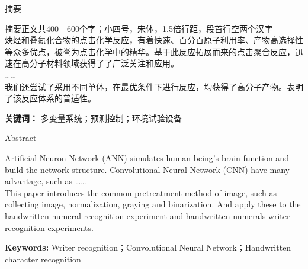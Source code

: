 \thispagestyle{plain}


\begin{center}
    \vspace{0.5\baselineskip}
    {\heiti {} 摘要}
    \vspace{0.5\baselineskip}
\end{center}

\songti {}
摘要正文共400—600个字；小四号，宋体，1.5倍行距，段首行空两个汉字\\
\hspace*{\parindent}炔烃和叠氮化合物的点击化学反应，有着快速、百分百原子利用率、产物高选择性等众多优点，被誉为点击化学中的精华。基于此反应拓展而来的点击聚合反应，迅速在高分子材料领域获得了了广泛关注和应用。\\
\hspace*{\parindent}……\\
\hspace*{\parindent}我们还尝试了采用不同单体，在最优条件下进行反应，均获得了高分子产物。表明了该反应体系的普适性。
\vspace{\baselineskip}

\noindent\textbf{\heiti {} 关键词：} 
\songti {} 多变量系统；预测控制；环境试验设备

\newpage

\thispagestyle{plain}


\begin{center}
    \vspace{0.5\baselineskip}
    { Abstract}
    \vspace{0.5\baselineskip}
\end{center}

Artificial Neuron Network (ANN) simulates human being’s brain function and build the network structure. Convolutional Neural Network (CNN) have many advantage, such as ……\\
\hspace*{\parindent}This paper introduces the common pretreatment method of image, such as collecting image, normalization, graying and binarization. And apply these to the handwritten numeral recognition experiment and handwritten numerals writer recognition experiments.

\vspace{\baselineskip}

\noindent\textbf{\heiti {} Keywords: } 
 Writer recognition；Convolutional Neural Network；Handwritten character recognition

\newpage
